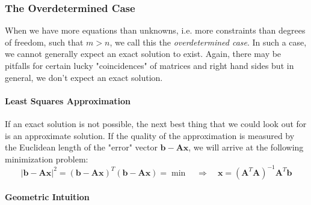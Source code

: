 


\subsubsection{The Overdetermined Case}
When we have more equations than unknowns, i.e. more constraints than degrees of freedom, such that $m > n$, we call this the \emph{overdetermined case}. In such a case, we cannot generally expect an exact solution to exist. Again, there may be pitfalls for certain lucky "coincidences" of matrices and right hand sides but in general, we don't expect an exact solution.



\paragraph{Least Squares Approximation}
If an exact solution is not possible, the next best thing that we could look out for is an approximate solution. If the quality of the approximation is measured by the Euclidean length of the "error" vector $\mathbf{b} - \mathbf{A x}$, we will arrive at the following minimization problem:
\begin{equation}
|\mathbf{b} - \mathbf{A x}|^2 = (\mathbf{b} - \mathbf{A x})^T (\mathbf{b} - \mathbf{A x}) = \min
\quad \Rightarrow \quad
\boxed{ \mathbf{x} = (\mathbf{A}^T \mathbf{A})^{-1} \mathbf{A}^T \mathbf{b} }
\end{equation}

\paragraph{Geometric Intuition}


